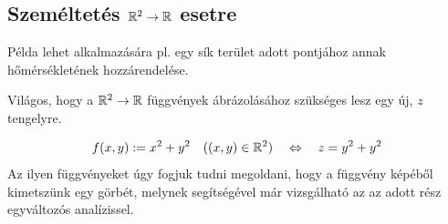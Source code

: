 \documentclass[a4paper,11.5pt]{article}
\begin{document}
	\subsection{Személtetés $\mathbb{R}^2\to\mathbb{R}$ esetre}
	\begin{note}
		Példa lehet alkalmazására pl. egy sík terület adott pontjához annak hőmérsékletének hozzárendelése.
	\end{note}
	\begin{note}
		Világos, hogy a $\mathbb{R}^2\to\mathbb{R}$ függvények ábrázolásához szükséges lesz egy új, $z$ tengelyre.
	\end{note}
	\begin{task}
		\[ f(x,y):=x^2+y^2\quad ((x,y)\in\mathbb{R}^2)\quad \Leftrightarrow\quad z=y^2+y^2 \]
		Az ilyen függvényeket úgy fogjuk tudni megoldani, hogy a függvény képéből kimetszünk egy görbét, melynek segítségével már vizsgálható az az adott rész egyváltozós analízissel.
		

\end{task}
\end{document}
